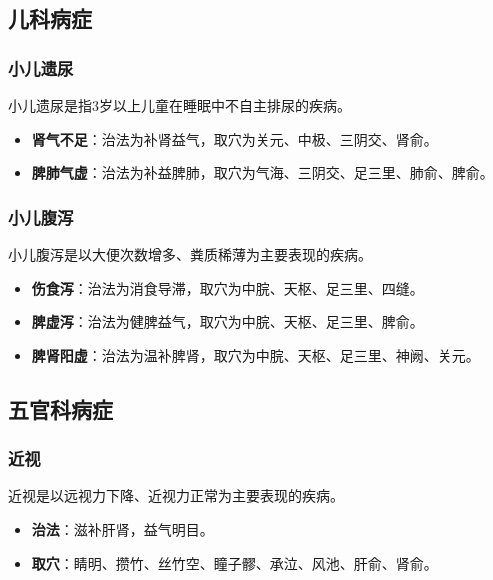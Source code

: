 \documentclass[12pt,UTF8]{ctexbook}
\begin{document}
\subsection{儿科病症}

\subsubsection{小儿遗尿}

小儿遗尿是指3岁以上儿童在睡眠中不自主排尿的疾病。

\begin{itemize}
\item \textbf{肾气不足}：治法为补肾益气，取穴为关元、中极、三阴交、肾俞。
\item \textbf{脾肺气虚}：治法为补益脾肺，取穴为气海、三阴交、足三里、肺俞、脾俞。
\end{itemize}

\subsubsection{小儿腹泻}

小儿腹泻是以大便次数增多、粪质稀薄为主要表现的疾病。

\begin{itemize}
\item \textbf{伤食泻}：治法为消食导滞，取穴为中脘、天枢、足三里、四缝。
\item \textbf{脾虚泻}：治法为健脾益气，取穴为中脘、天枢、足三里、脾俞。
\item \textbf{脾肾阳虚}：治法为温补脾肾，取穴为中脘、天枢、足三里、神阙、关元。
\end{itemize}

\subsection{五官科病症}

\subsubsection{近视}

近视是以远视力下降、近视力正常为主要表现的疾病。

\begin{itemize}
\item \textbf{治法}：滋补肝肾，益气明目。
\item \textbf{取穴}：睛明、攒竹、丝竹空、瞳子髎、承泣、风池、肝俞、肾俞。
\end{itemize}
\end{document}

